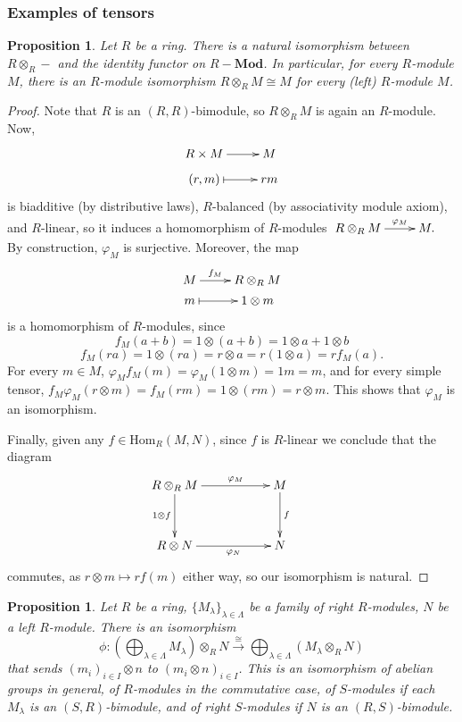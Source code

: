 \documentclass{amsart}[12pt]
\newcommand{\Hom}{\mathrm{Hom}}
\numberwithin{equation}{section}
\theoremstyle{plain} %
\newtheorem{prop}[equation]{Proposition}
\theoremstyle{definition}
\theoremstyle{remark}
\newcommand{\sssec}[1]{\subsubsection{#1}}
\newcommand{\xra}[1]{\xrightarrow{#1}}
\newcommand{\Mod}[1]{#1-\mathbf{Mod}}
\begin{document}
\sssec{Examples of tensors}

\begin{prop}
Let $R$ be a ring. There is a natural isomorphism between $R\otimes_R -$ and the identity functor on $\Mod{R}$. In particular, for every $R$-module $M$, there is an $R$-module isomorphism $R\otimes_R M \cong M$ for every (left) $R$-module $M$.
\end{prop}
\begin{proof}Note that $R$ is an $(R,R)$-bimodule, so $R\otimes_R M$ is again an $R$-module.
Now, 	$$\xymatrix@R=2mm{R \times M \ar[r] & M \\
	(r,m) \ar@{|->}[r] & rm}$$
	is biadditive (by distributive laws), $R$-balanced (by associativity module axiom), and $R$-linear, so it
	induces a homomorphism of $R$-modules $\xymatrix{R \otimes_R M \ar[r]^-{\varphi_M} & M.}$ By construction, $\varphi_M$ is surjective. Moreover, the map 
	$$\xymatrix@R=1mm{M \ar[r]^-{f_M} & R \otimes_R M \\ m \ar@{|->}[r] & 1 \otimes m}$$ 
	is a homomorphism of $R$-modules, since 
	\[f_M(a+b) = 1 \otimes (a+b) = 1 \otimes a + 1 \otimes b\]
	\[ f_M(ra) = 1 \otimes (ra) =  r\otimes a = r(1 \otimes a) = rf_M(a).\]
	For every $m \in M$, $\varphi_M f_M(m) = \varphi_M(1 \otimes m) = 1m = m$, and for every simple tensor, $f_M \varphi_M (r \otimes m) = f_M(rm) = 1 \otimes (rm) = r \otimes m$. This shows that $\varphi_M$ is an isomorphism.
	
	Finally, given any $f \in \Hom_R(M,N)$, since $f$ is $R$-linear we conclude that the diagram
	$$\xymatrix@R=5mm@C=5mm{
	 R \otimes_R M \ar[rrr]^-{\varphi_M} \ar[dd]_-{1 \otimes f} &&& M \ar[dd]^-{f} \\
	&&&&\\
	 R \otimes N \ar[rrr]_-{\varphi_N} &&& N
	}$$
	commutes, as $r\otimes m \mapsto rf(m)$ either way, so our isomorphism is natural.
\end{proof}



\begin{prop} Let  $R$ be a ring, $\{M_\lambda\}_{\lambda\in \Lambda}$ be  a family of right $R$-modules, $N$ be a left $R$-module. There is an isomorphism
$$
\phi: \left(\bigoplus_{\lambda\in \Lambda} M_\lambda \right) \otimes_R N \xra{\cong} \bigoplus_{\lambda\in \Lambda} \left(M_\lambda \otimes_R N\right)
$$
that sends $(m_i)_{i \in I} \otimes n$ to $(m_i \otimes n)_{i \in I}$.
This is an isomorphism of abelian groups in general, of $R$-modules in the commutative case, of $S$-modules if each $M_\lambda$ is an $(S,R)$-bimodule, and of right $S$-modules if $N$ is an $(R,S)$-bimodule.
\end{prop}
\end{document}

